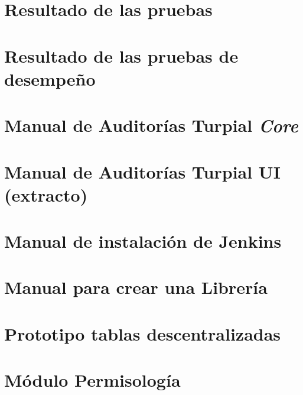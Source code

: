 \documentclass[onehalfspace]{USB}
\begin{document}
\chapter{Resultado de las pruebas}


\chapter{Resultado de las pruebas de desempeño}


\chapter{Manual de Auditorías Turpial \textit{Core}}


\chapter{Manual de Auditorías Turpial UI (extracto)}


\chapter{Manual de instalación de Jenkins}


\chapter{Manual para crear una Librería}


\chapter{Prototipo tablas descentralizadas}


\chapter{Módulo Permisología}


\end{document}
